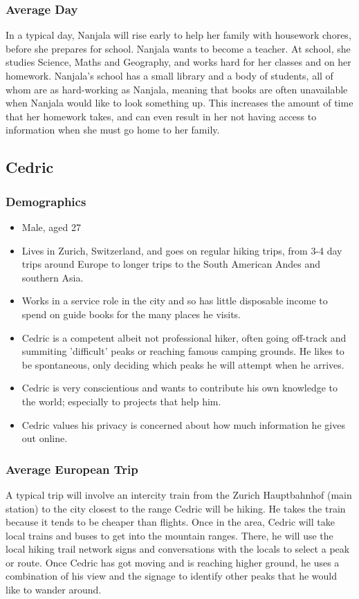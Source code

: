\documentclass{article}
\begin{document}
\subsubsection{Average Day}
In a typical day, Nanjala will rise early to help her family with housework chores, before she prepares for school.  Nanjala wants to become a teacher.  At school, she studies Science, Maths and Geography, and works hard for her classes and on her homework.  Nanjala's school has a small library and a body of students, all of whom are as hard-working as Nanjala, meaning that books are often unavailable when Nanjala would like to look something up.  This increases the amount of time that her homework takes, and can even result in her not having access to information when she must go home to her family.

\newpage
\subsection{Cedric}
\subsubsection{Demographics}
\begin{itemize}
  \item Male, aged 27
  \item Lives in Zurich, Switzerland, and goes on regular hiking trips, from 3-4 day trips around Europe to longer trips to the South American Andes and southern Asia.
  \item Works in a service role in the city and so has little disposable income to spend on guide books for the many places he visits.
  \item Cedric is a competent albeit not professional hiker, often going off-track and summiting 'difficult' peaks or reaching famous camping grounds.  He likes to be spontaneous, only deciding which peaks he will attempt when he arrives.
  \item Cedric is very conscientious and wants to contribute his own knowledge to the world; especially to projects that help him.
  \item Cedric values his privacy is concerned about how much information he gives out online.
\end{itemize}
\subsubsection{Average European Trip}
A typical trip will involve an intercity train from the Zurich Hauptbahnhof (main station) to the city closest to the range Cedric will be hiking.  He takes the train because it tends to be cheaper than flights.  Once in the area, Cedric will take local trains and buses to get into the mountain ranges.  There, he will use the local hiking trail network signs and conversations with the locals to select a peak or route.  Once Cedric has got moving and is reaching higher ground, he uses a combination of his view and the signage to identify other peaks that he would like to wander around.  
\end{document}
